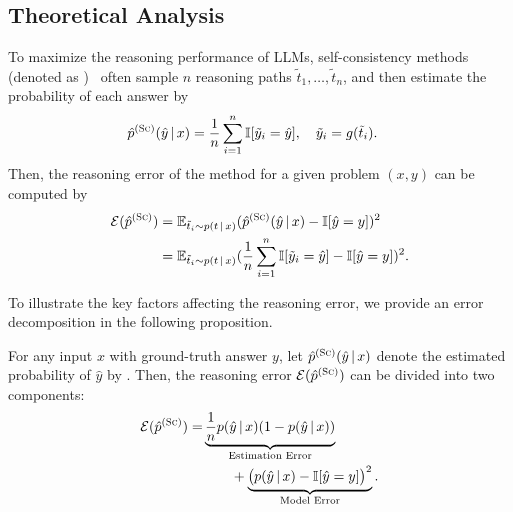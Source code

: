 \subsection{Theoretical Analysis}

To maximize the reasoning performance of LLMs, 
self-consistency methods (denoted as \SC)~\citep{xiong2023can, yadkori2024believe, becker2024cycles} often sample $n$ reasoning paths $\tilde{t}_1, \dots, \tilde{t}_n$, and then estimate the probability of each answer by 
\begin{equation*}
    \begin{aligned}
\hat{p}^{(\textsc{Sc})}(\hat{y} \,|\, x) 
&= \frac{1}{n} \sum_{i=1}^n \mathbb{I}[\tilde{y}_i = \hat{y}], \quad \tilde{y}_i = g(\tilde{t}_i).
    \end{aligned}
\end{equation*}
Then, the reasoning error of the \SC method for a given problem $(x,y)$ can be computed by
\begin{equation*}
\begin{aligned}
\mathcal{E}(\hat{p}^{(\textsc{Sc})}) &= \mathbb{E}_{\tilde{t}_i \sim p(t \,|\, x)}( \hat{p}^{(\textsc{Sc})}(\hat{y} \,|\, x) - \mathbb{I}[\hat{y} = y] )^2 \\
&=\mathbb{E}_{\tilde{t}_i \sim p(t \,|\, x)}( \frac{1}{n} \sum_{i=1}^n \mathbb{I}[\tilde{y}_i = \hat{y}] - \mathbb{I}[\hat{y} = y] )^2.
\end{aligned}
\end{equation*}

To illustrate the key factors affecting the reasoning error, 
we provide an error decomposition in the following proposition. 

\begin{proposition}
\label{prop:sc-reasoning-error-decomposition}
For any input $x$ with ground-truth answer $y$, let $\hat{p}^{(\textsc{Sc})}(\hat{y} \,|\, x)$ denote the estimated probability of $\hat{y}$ by \SC.
Then, the reasoning error $\mathcal{E}(\hat{p}^{(\textsc{Sc})})$ can be divided into two components: 
\begin{equation*}
    \begin{aligned}
        \mathcal{E}(\hat{p}^{(\textsc{Sc})}) 
        = & \underbrace{\frac{1}{n} p(\hat{y} \,|\, x) (1- p(\hat{y}\,|\, x))}_{\text{Estimation Error}} \\
        & \qquad +  \underbrace{\big (p(\hat{y} \,|\, x) - \mathbb{I}[\hat{y} = y] \big )^2}_{\text{Model Error}}. 
    \end{aligned}
\end{equation*}
\end{proposition}

